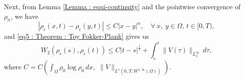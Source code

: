 \documentclass{amsart}
\numberwithin{equation}{section}
\begin{document}
Next, from Lemma \ref{Lemma : equi-continuity} and the pointwise
convergence of $\rho_n$, we have
\begin{equation}\label{eq18 : Theorem : Toy Fokker-Plank}
\left |\rho_\epsilon (x,t)-\rho_\epsilon(y,t)\right | \leq C |x-y|^\alpha, \quad
\forall ~x,~y \in \Omega, \, t \in [0,T),
\end{equation}
and \eqref{eq5 : Theorem : Toy Fokker-Plank} gives us
\begin{equation}\label{eq20 : Theorem : Toy Fokker-Plank}
W_{2}(\rho_\epsilon(s),\rho_\epsilon(t))\leq C |t-s|^{\frac{1}{2}} + \int_s^t
\|V(\tau)\|_{L^\infty_x}  \,d\tau,
\end{equation}
where $C=C\left(  \int_\Omega \rho_0 \log \rho_0 \, dx,  \,  \,\|V\|_{L^1(0,T; W^{1,\infty}(\Omega))} \right) $.
\end{document}

